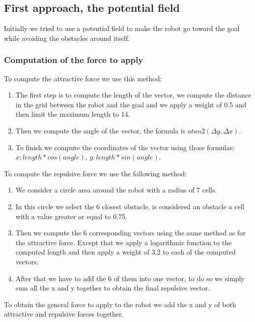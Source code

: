 \subsection{First approach, the potential field}

Initially we tried to use a potential field to make the robot go toward the goal while avoiding the obstacles around itself.

\subsubsection{Computation of the force to apply}

To compute the attractive force we use this method:

\begin{enumerate}
    \item The first step is to compute the length of the vector, we compute the distance in the grid between the robot and the goal and we apply a weight of 0.5 and then limit the maximum length to 14.
    \item Then we compute the angle of the vector, the formula is $atan2(\Delta y, \Delta x)$.
    \item To finish we compute the coordinates of the vector using those formulas: $x: length * cos(angle)$, $y: length * sin(angle)$.
\end{enumerate}

To compute the repulsive force we use the following method:

\begin{enumerate}
    \item We consider a circle area around the robot with a radius of 7 cells.
    \item In this circle we select the 6 closest obstacle, is considered an obstacle a cell with a value greater or equal to 0.75.
    \item Then we compute the 6 corresponding vectors using the same method as for the attractive force. Except that we apply a logarithmic function to the computed length and then apply a weight of 3.2 to each of the computed vectors.
    \item After that we have to add the 6 of them into one vector, to do so we simply sum all the x and y together to obtain the final repulsive vector.
\end{enumerate}

To obtain the general force to apply to the robot we add the x and y of both attractive and repulsive forces together.

